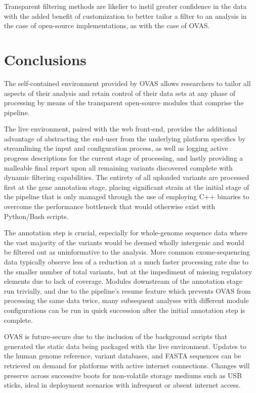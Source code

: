\documentclass[twocolumn]{bmcart}%
\def\app{OVAS}
\begin{document}
Transparent filtering methods are likelier to instil greater confidence in the data with the added benefit of customization to better tailor a filter to an analysis in the case of open-source implementations, as with the case of \app{}.



\section*{Conclusions}

The self-contained environment provided by \app{} allows researchers to tailor all aspects of their analysis and retain control of their data sets at any phase of processing by means of the transparent open-source modules that comprise the pipeline. 

The live environment, paired with the web front-end, provides the additional advantage of abstracting the end-user from the underlying platform specifics by streamlining the input and configuration process, as well as logging active progress descriptions for the current stage of processing, and lastly providing a malleable final report upon all remaining variants discovered complete with dynamic filtering capabilities. The entirety of all uploaded variants are processed first at the gene annotation stage, placing significant strain at the initial stage of the pipeline that is only managed through the use of employing C++ binaries to overcome the performance bottleneck that would otherwise exist with Python/Bash scripts.

The annotation step is crucial, especially for whole-genome sequence data where the vast majority of the variants would be deemed wholly intergenic and would be filtered out as uninformative to the analysis. More common exome-sequencing data typically observe less of a reduction at a much faster processing rate due to the smaller number of total variants, but at the impediment of missing regulatory elements due to lack of coverage. Modules downstream of the annotation stage run trivially, and due to the pipeline's resume feature which prevents \app{} from processing the same data twice, many subsequent analyses with different module configurations can be run in quick succession after the initial annotation step is complete.

\app{} is future-secure due to the inclusion of the background scripts that generated the static data being packaged with the live environment. Updates to the human genome reference, variant databases, and FASTA sequences can be retrieved on demand for platforms with active internet connections. Changes will preserve across successive boots for non-volatile storage mediums such as USB sticks, ideal in deployment scenarios with infrequent or absent internet access.
\end{document}
